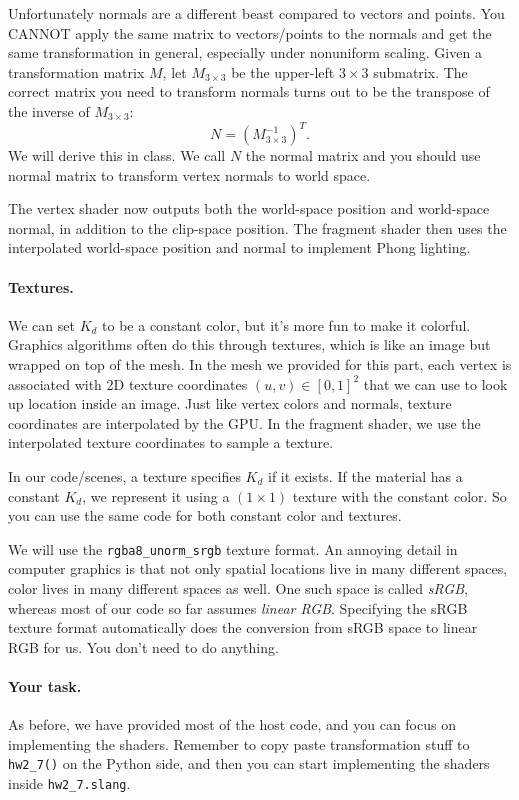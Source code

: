 Unfortunately normals are a different beast compared to vectors and points. You CANNOT apply the same matrix to vectors/points to the normals and get the same transformation in general, especially under nonuniform scaling. Given a transformation matrix $M$, let $M_{3 \times 3}$ be the upper-left $3\times 3$ submatrix. The correct matrix you need to transform normals turns out to be the transpose of the inverse of $M_{3 \times 3}$:
\begin{equation}
    N = (M_{3 \times 3}^{-1})^T.
\end{equation}
We will derive this in class. We call $N$ the normal matrix and you should use normal matrix to transform vertex normals to world space. 

The vertex shader now outputs both the world-space position and world-space normal, in addition to the clip-space position. The fragment shader then uses the
interpolated world-space position and normal to implement Phong lighting.

\paragraph{Textures.} We can set $K_d$ to be a constant color, but it's more fun to make it colorful. Graphics algorithms often do this through textures, which is like an image but wrapped on top of the mesh. In the mesh we provided for this part, each vertex is associated with 2D texture coordinates $(u, v) \in [0, 1]^2$ that we can use to look up location inside an image. Just like vertex colors and normals, texture coordinates are interpolated by the GPU. In the fragment shader, we use the interpolated texture coordinates to sample a texture.

In our code/scenes, a texture specifies $K_d$ if it exists. If the material has a constant $K_d$, we represent it using a $(1 \times 1)$ texture with the constant color. So you can use the same code for both constant color and textures.

We will use the \lstinline{rgba8_unorm_srgb} texture format. An annoying detail in computer graphics is that not only spatial locations live in many different spaces, color lives in many different spaces as well. One such space is called \emph{sRGB}, whereas most of our code so far assumes \emph{linear RGB}. Specifying the sRGB texture format automatically does the conversion from sRGB space to linear RGB for us. You don't need to do anything.

\paragraph{Your task.} As before, we have provided most of the host code, and you can focus on implementing the shaders. Remember to copy paste transformation stuff to \lstinline{hw2_7()} on the Python side, and then you can start implementing the shaders inside \lstinline{hw2_7.slang}.

